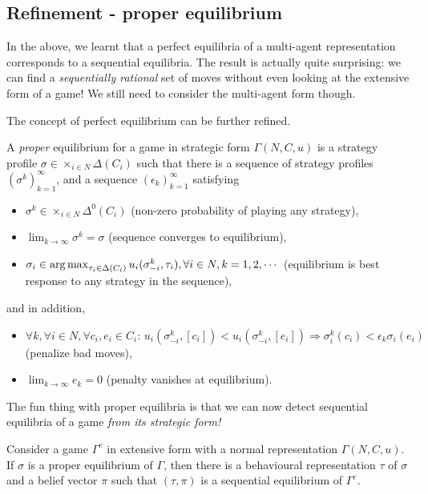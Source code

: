 \subsection{Refinement - proper equilibrium}

In the above, we learnt that a perfect equilibria of a multi-agent representation corresponds to a sequential equilibria. The result is actually quite surprising: we can find a \emph{sequentially rational} set of moves without even looking at the extensive form of a game! We still need to consider the multi-agent form though.

The concept of perfect equilibrium can be further refined.
\begin{definition}
A \emph{proper} equilibrium for a game in strategic form $\Gamma(N,C,u)$ is a strategy profile $\sigma \in \times_{i \in N} \Delta (C_i)$ such that there is a sequence of strategy profiles $ (\sigma^k)_{k = 1}^\infty$, and a sequence $(\epsilon_k)_{k = 1}^{\infty}$ satisfying
\begin{itemize}
\item $\sigma^k \in \times_{i \in N} \Delta^0 (C_i)$ (non-zero probability of playing any strategy),
\item $\lim_{k \rightarrow \infty} \sigma^k = \sigma$ (sequence converges to equilibrium),
\item $ \sigma_i \in \operatorname*{arg\,max}_{\tau_i \in \Delta(C_i)}u_i(\sigma^k_{-i}, \tau_i), \forall i \in N, k = 1,2, \cdots $ (equilibrium is best response to any strategy in the sequence),
\end{itemize}
and in addition,
\begin{itemize}
\item $\forall k, \forall i \in N, \forall c_i, e_i \in C_i: \, u_i(\sigma_{-i}^k, [c_i]) < u_i(\sigma_{-i}^k, [e_i]) \Rightarrow \sigma^k_i(c_i) < \epsilon_k \sigma_i(e_i)$ (penalize bad moves),
\item $\lim_{k \rightarrow \infty} e_k = 0$ (penalty vanishes at equilibrium).
\end{itemize}
\label{ch5:def:properEq}
\end{definition}

The fun thing with proper equilibria is that we can now detect sequential equilibria of a game \emph{from its strategic form!}

\begin{theorem}
Consider a game $\Gamma^e$ in extensive form with a normal representation $\Gamma(N,C,u)$.
If $\sigma$ is a proper equilibrium of $\Gamma$, then there is a behavioural representation $\tau$ of $\sigma$ and a belief vector $\pi$ such that $(\tau, \pi)$ is a sequential equilibrium of $\Gamma^e$.
\end{theorem}

